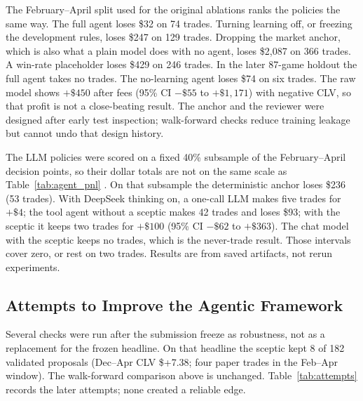 \documentclass[11pt,a4paper]{article}
\begin{document}
The February--April split used for the original ablations ranks the policies
the same way. The full agent loses \$32 on 74 trades. Turning learning off,
or freezing the development rules, loses \$247 on 129 trades. Dropping the
market anchor, which is also what a plain model does with no agent, loses
\$2,087 on 366 trades. A win-rate placeholder loses \$429 on 246 trades. In
the later 87-game holdout the full agent takes no trades. The no-learning
agent loses \$74 on six trades. The raw model shows $+\$450$ after fees
(95\% CI $-\$55$ to $+\$1{,}171$) with negative CLV, so that profit is not a
close-beating result. The anchor and the reviewer were designed after early
test inspection; walk-forward checks reduce training leakage but cannot undo
that design history.

The LLM policies were scored on a fixed 40\% subsample of the February--April
decision points, so their dollar totals are not on the same scale as
Table~\ref{tab:agent_pnl} \cite{llm-evaluation}. On that subsample the
deterministic anchor loses \$236 (53 trades). With DeepSeek thinking on, a
one-call LLM makes five trades for $+\$4$; the tool agent without a sceptic
makes 42 trades and loses \$93; with the sceptic it keeps two trades for
$+\$100$ (95\% CI $-\$62$ to $+\$363$). The chat model with the sceptic keeps
no trades, which is the never-trade result. Those intervals cover zero, or
rest on two trades. Results are from saved artifacts, not rerun experiments.

\subsection{Attempts to Improve the Agentic Framework}
Several checks were run after the submission freeze as robustness, not as a
replacement for the frozen headline. On that headline the sceptic kept 8 of
182 validated proposals (Dec--Apr CLV \$+7.38; four paper trades in the
Feb--Apr window). The walk-forward comparison above is unchanged.
Table~\ref{tab:attempts} records the later attempts; none created a reliable
edge.
\end{document}

